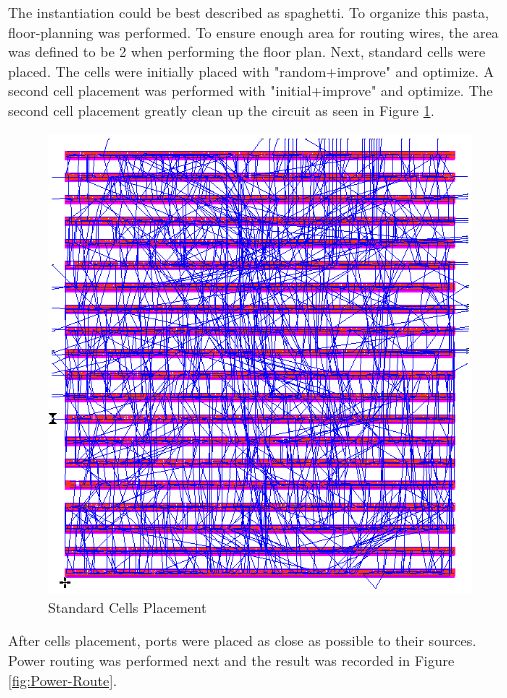 \documentclass[11pt]{article}
\begin{document}
		The instantiation could be best described as spaghetti. To organize this pasta, floor-planning was performed. To ensure enough area for routing wires, the area was defined to be 2 when performing the floor plan. Next, standard cells were placed. The cells were initially placed with "random+improve" and optimize. A second cell placement was performed with "initial+improve" and optimize. The second cell placement greatly clean up the circuit as seen in Figure \ref{fig:Std-Cells}.
	
		\begin{figure}[H] 
			\centering 
			\includegraphics[width=\textwidth,height=\dimexpr\textheight-4\baselineskip-\abovecaptionskip-\belowcaptionskip\relax,keepaspectratio]{"Pictures/Std Cells"}
			\caption{Standard Cells Placement} 
			\label{fig:Std-Cells} 
		\end{figure}
	
		After cells placement, ports were placed as close as possible to their sources. Power routing was performed next and the result was recorded in Figure \ref{fig:Power-Route}.
		
\end{document}
